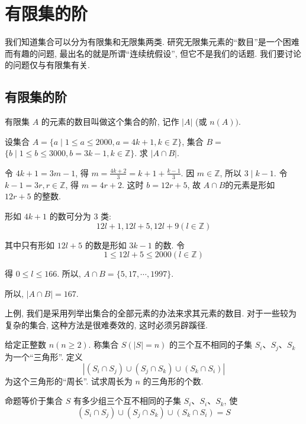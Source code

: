 \section{有限集的阶}
我们知道集合可以分为有限集和无限集两类. 研究无限集元素的“数目”是一个困难而有趣的问题, 最出名的就是所谓“连续统假设”, 但它不是我们的话题. 我们要讨论的问题仅与有限集有关.
\subsection{有限集的阶}
有限集 $A$ 的元素的数目叫做这个集合的阶, 记作 $|A|$ (或 $n(A))$.
\begin{example}
	设集合 $A=\{a \mid 1 \leqslant a \leqslant 2000, a=4 k+1, k \in \mathbb{Z}\}$, 集合 $B=$ $\{b \mid 1 \leqslant b \leqslant 3000, b=3 k-1, k \in \mathbb{Z}\}$. 求 $|A \cap B|$.
\end{example}

\begin{analysis}
	令 $4 k+1=3 m-1$, 得 $m=\frac{4 k+2}{3}=k+1+\frac{k-1}{3}$. 因 $m \in \mathbb{Z}$, 所以 $3 \mid k-1$. 令 $k-1=3 r, r \in \mathbb{Z}$, 得 $m=4 r+2$. 这时 $b=12 r+5$, 故 $A \cap B$的元素是形如 $12 r+5$ 的整数.
\end{analysis}

\begin{solution}
	形如 $4 k+1$ 的数可分为 3 类:
	$$
		12 l+1,12 l+5,12 l+9(l \in \mathbb{Z})
	$$

	其中只有形如 $12 l+5$ 的数是形如 $3 k-1$ 的数. 令
	$$
		1 \leqslant 12 l+5 \leqslant 2000(l \in \mathbb{Z})
	$$

	得 $0 \leqslant l \leqslant 166$. 所以, $A \cap B=\{5,17, \cdots, 1997\}$.

	所以, $|A \cap B|=167$.
\end{solution}

\begin{note}
	上例, 我们是采用列举出集合的全部元素的办法来求其元素的数目. 对于一些较为复杂的集合, 这种方法是很难奏效的, 这时必须另辟蹊径.
\end{note}

\begin{example}
	给定正整数 $n(n \geqslant 2)$. 称集合 $S(|S|=n)$ 的三个互不相同的子集 $S_{i} 、 S_{j} 、 S_{k}$ 为一个“三角形”. 定义
	$$
		\left|\left(S_{i} \cap S_{j}\right) \cup\left(S_{j} \cap S_{k}\right) \cup\left(S_{k} \cap S_{i}\right)\right|
	$$
	为这个三角形的“周长”. 试求周长为 $n$ 的三角形的个数.
\end{example}

\begin{analysis}
	命题等价于集合 $S$ 有多少组三个互不相同的子集 $S_{i} 、 S_{i} 、 S_{k}$, 使
	$$
		\left(S_{i} \cap S_{j}\right) \cup\left(S_{j} \cap S_{k}\right) \cup\left(S_{k} \cap S_{i}\right)=S
	$$
\end{analysis}


